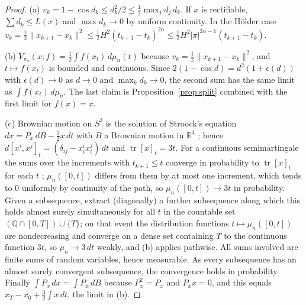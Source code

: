 \documentclass[11pt,reqno]{amsart}
\theoremstyle{definition}
\theoremstyle{remark}
\numberwithin{equation}{section}
\newcommand{\R}{\mathbb{R}}
\newcommand{\Q}{\mathbb{Q}}
\begin{document}
\begin{proof}
(a) $v_k=1-\cos d_k\le d_k^2/2\le\tfrac12\max_jd_j\,d_k$.  If $x$ is rectifiable, $\sum d_k\le L(x)$ and
$\max d_k\to0$ by uniform continuity.  In the H\"older case $v_k=\tfrac12\lVert x_{k+1}-x_k\rVert^2\le
\tfrac12H^2(t_{k+1}-t_k)^{2\alpha}\le\tfrac12H^2\lvert\pi\rvert^{2\alpha-1}(t_{k+1}-t_k)$.

(b) $V_{\pi_n}(x;f)=\tfrac12\int f(x_t)\,d\mu_n(t)$ because $v_k=\tfrac12\lVert x_{k+1}-x_k\rVert^2$, and
$t\mapsto f(x_t)$ is bounded and continuous.  Since $2(1-\cos d)=d^2(1+\epsilon(d))$ with $\epsilon(d)\to0$ as
$d\to0$ and $\max_kd_k\to0$, the second sum has the same limit as $\int f(x_t)\,d\mu_n$.  The last claim is
Proposition~\ref{prop:split} combined with the first limit for $f(x)=x$.

(c) Brownian motion on $S^3$ is the solution of Stroock's equation $dx=P_x\,dB-\tfrac32x\,dt$ with $B$ a
Brownian motion in $\R^4$ \cite{Stroock,Hsu}; hence $d[x^i,x^j]_t=(\delta_{ij}-x^i_tx^j_t)\,dt$
and $\operatorname{tr}[x]_t=3t$.  For a continuous semimartingale the sums over the increments with $t_{k+1}\le t$ converge in probability to
$\operatorname{tr}[x]_t$ for each $t$ \cite[Ch.~IV, \S1]{RY}; $\mu_n([0,t])$ differs from them by at most one increment, which tends
to $0$ uniformly by continuity of the path, so $\mu_n([0,t])\to3t$ in probability.
Given a subsequence, extract (diagonally) a further subsequence along which this holds almost surely
simultaneously for all $t$ in the countable set $(\Q\cap[0,T])\cup\{T\}$; on that event the distribution functions
$t\mapsto\mu_n([0,t])$ are nondecreasing and converge on a dense set containing $T$ to the continuous function $3t$,
so $\mu_n\to3\,dt$ weakly, and (b) applies pathwise.  All sums involved are finite sums of random variables, hence
measurable.  As every subsequence has an almost surely convergent subsequence, the convergence holds in
probability.  Finally $\int P_x\,dx=\int P_x\,dB$ because $P_x^2=P_x$ and $P_xx=0$, and this equals
$x_T-x_0+\tfrac32\int x\,dt$, the limit in (b).


\end{proof}
\end{document}
